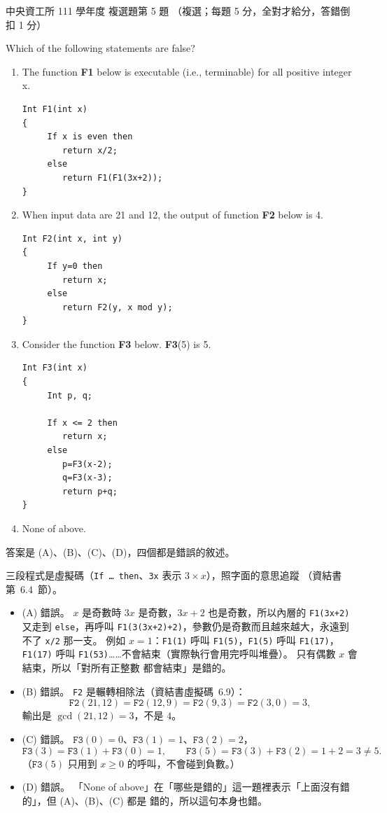 \begin{pastexam}[label={px:ncu-111-dsa-05}]{中央資工所 111 學年度 複選題第 5 題}
（複選；每題 5 分，全對才給分，答錯倒扣 1 分）

Which of the following statements are false?
\begin{enumerate}[label=(\Alph*)]
\item The function \textbf{F1} below is executable (i.e., terminable) for all positive integer x.
\begin{verbatim}
Int F1(int x)
{
     If x is even then
        return x/2;
     else
        return F1(F1(3x+2));
}
\end{verbatim}
\item When input data are 21 and 12, the output of function \textbf{F2} below is 4.
\begin{verbatim}
Int F2(int x, int y)
{
     If y=0 then
        return x;
     else
        return F2(y, x mod y);
}
\end{verbatim}
\item Consider the function \textbf{F3} below. \textbf{F3}(5) is 5.
\begin{verbatim}
Int F3(int x)
{
     Int p, q;

     If x <= 2 then
        return x;
     else
        p=F3(x-2);
        q=F3(x-3);
        return p+q;
}
\end{verbatim}
\item None of above.
\end{enumerate}
\end{pastexam}

\begin{pastsoln}
答案是 (A)、(B)、(C)、(D)，四個都是錯誤的敘述。

三段程式是虛擬碼（\texttt{If \ldots{} then}、\texttt{3x} 表示 $3 \times x$），照字面的意思追蹤
（資結書第~6.4~節）。
\begin{itemize}
\item (A) 錯誤。 $x$ 是奇數時 $3x$ 是奇數，$3x + 2$ 也是奇數，所以內層的 \texttt{F1(3x+2)} 又走到
\texttt{else}，再呼叫 \texttt{F1(3(3x+2)+2)}，參數仍是奇數而且越來越大，永遠到不了 \texttt{x/2} 那一支。
例如 $x = 1$：\texttt{F1(1)} 呼叫 \texttt{F1(5)}，\texttt{F1(5)} 呼叫 \texttt{F1(17)}，\texttt{F1(17)}
呼叫 \texttt{F1(53)}……不會結束（實際執行會用完呼叫堆疊）。 只有偶數 $x$ 會結束，所以「對所有正整數
都會結束」是錯的。
\item (B) 錯誤。 \texttt{F2} 是輾轉相除法（資結書虛擬碼~6.9）：
\[
\mathtt{F2}(21, 12) = \mathtt{F2}(12, 9) = \mathtt{F2}(9, 3) = \mathtt{F2}(3, 0) = 3,
\]
輸出是 $\gcd(21, 12) = 3$，不是 $4$。
\item (C) 錯誤。 $\mathtt{F3}(0) = 0$、$\mathtt{F3}(1) = 1$、$\mathtt{F3}(2) = 2$，
\[
\mathtt{F3}(3) = \mathtt{F3}(1) + \mathtt{F3}(0) = 1, \qquad
\mathtt{F3}(5) = \mathtt{F3}(3) + \mathtt{F3}(2) = 1 + 2 = 3 \ne 5.
\]
（$\mathtt{F3}(5)$ 只用到 $x \ge 0$ 的呼叫，不會碰到負數。）
\item (D) 錯誤。 「None of above」在「哪些是錯的」這一題裡表示「上面沒有錯的」，但 (A)、(B)、(C) 都是
錯的，所以這句本身也錯。
\end{itemize}
\end{pastsoln}
